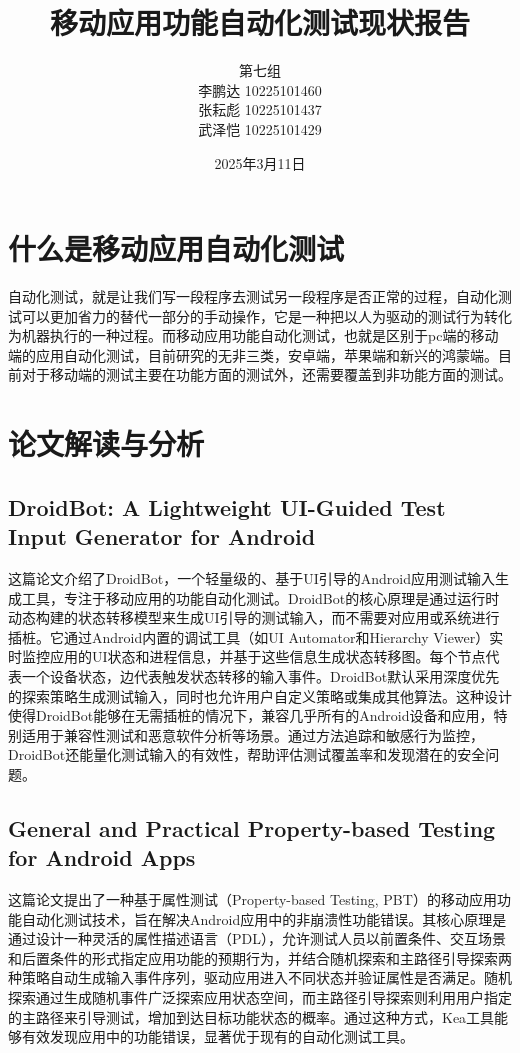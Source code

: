 \documentclass[UTF8, fontset=windows]{article}
\title{\textbf{移动应用功能自动化测试现状报告}}
\author{第七组 \\ 
李鹏达 10225101460 \\
张耘彪 10225101437 \\
武泽恺 10225101429
}
\date{2025年3月11日}
\begin{document}
\maketitle

\section{什么是移动应用自动化测试}

自动化测试，就是让我们写一段程序去测试另一段程序是否正常的过程，自动化测试可以更加省力的替代一部分的手动操作，它是一种把以人为驱动的测试行为转化为机器执行的一种过程。而移动应用功能自动化测试，也就是区别于pc端的移动端的应用自动化测试，目前研究的无非三类，安卓端，苹果端和新兴的鸿蒙端。目前对于移动端的测试主要在功能方面的测试外，还需要覆盖到非功能方面的测试。

\section{论文解读与分析}

\subsection{DroidBot: A Lightweight UI-Guided Test Input Generator for Android}

这篇论文介绍了DroidBot，一个轻量级的、基于UI引导的Android应用测试输入生成工具，专注于移动应用的功能自动化测试。DroidBot的核心原理是通过运行时动态构建的状态转移模型来生成UI引导的测试输入，而不需要对应用或系统进行插桩。它通过Android内置的调试工具（如UI Automator和Hierarchy Viewer）实时监控应用的UI状态和进程信息，并基于这些信息生成状态转移图。每个节点代表一个设备状态，边代表触发状态转移的输入事件。DroidBot默认采用深度优先的探索策略生成测试输入，同时也允许用户自定义策略或集成其他算法。这种设计使得DroidBot能够在无需插桩的情况下，兼容几乎所有的Android设备和应用，特别适用于兼容性测试和恶意软件分析等场景。通过方法追踪和敏感行为监控，DroidBot还能量化测试输入的有效性，帮助评估测试覆盖率和发现潜在的安全问题。  

\subsection{General and Practical Property-based Testing for Android Apps}

这篇论文提出了一种基于属性测试（Property-based Testing, PBT）的移动应用功能自动化测试技术，旨在解决Android应用中的非崩溃性功能错误。其核心原理是通过设计一种灵活的属性描述语言（PDL），允许测试人员以前置条件、交互场景和后置条件的形式指定应用功能的预期行为，并结合随机探索和主路径引导探索两种策略自动生成输入事件序列，驱动应用进入不同状态并验证属性是否满足。随机探索通过生成随机事件广泛探索应用状态空间，而主路径引导探索则利用用户指定的主路径来引导测试，增加到达目标功能状态的概率。通过这种方式，Kea工具能够有效发现应用中的功能错误，显著优于现有的自动化测试工具。
\end{document}
